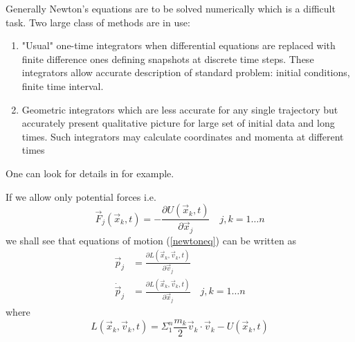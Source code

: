 Generally Newton's equations are to be solved numerically which is a difficult
task. Two large class of methods are in use: 
\begin{enumerate} 
    \item "Usual" one-time integrators when differential equations are replaced
        with finite difference ones defining snapshots at discrete time steps.
        These integrators allow accurate description of standard problem:
        initial conditions, finite time interval. 

\item Geometric integrators which are less accurate for any single trajectory
    but accurately present qualitative picture for large set of initial data
        and long times. Such integrators may calculate  coordinates and momenta
        at different times
\end{enumerate}
One can look for details in \cite{Hairer-Lubich-Wanner} for example. 

If we allow only potential forces i.e. 
\begin{equation}
  \label {potforce}
        \vec F_j(\vec x_k,t)=-\frac{\partial U(\vec x_k,t)}{\partial \vec x_j} \quad j,k=1\ldots n 
\end{equation}
we shall see that equations of motion (\ref{newtoneq}) can be written as 
\begin{equation}
   \label {lagr}
   \begin{split}
      \vec p_j&=\frac{\partial L(\vec x_k,\vec v_k,t)}{\partial \vec v_j} \\ 
        \dot \vec p_j&= \frac{\partial L(\vec x_k,\vec v_k,t)}{\partial \vec x_j}\quad j,k=1\ldots n 
   \end{split}
\end{equation}  
where 
\begin{equation}
  \label{lagr3}
        L(\vec x_k,\vec v_k,t)=\Sigma_1^n \frac{m_k}{2} \vec v_k \cdot \vec v_k-U(\vec x_k,t) 
\end{equation}

